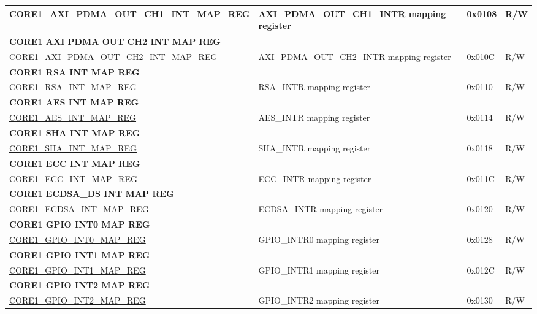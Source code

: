 \begin{longtable}{ | p{7.5cm} | p{7.2cm} | p{1.3cm} | p{1cm} | }
\hyperref[regdesc:CORE1AXIPDMAOUTCH1INTMAPREG]{CORE1\_AXI\_PDMA\_OUT\_CH1\_INT\_MAP\_REG} & AXI\_PDMA\_OUT\_CH1\_INTR mapping register & 0x0108 & R/W \\ \hline
\multicolumn{4}{|l|}{\textbf{CORE1 AXI PDMA OUT CH2 INT MAP REG}} \\ \hline
\hyperref[regdesc:CORE1AXIPDMAOUTCH2INTMAPREG]{CORE1\_AXI\_PDMA\_OUT\_CH2\_INT\_MAP\_REG} & AXI\_PDMA\_OUT\_CH2\_INTR mapping register & 0x010C & R/W \\ \hline
\multicolumn{4}{|l|}{\textbf{CORE1 RSA INT MAP REG}} \\ \hline
\hyperref[regdesc:CORE1RSAINTMAPREG]{CORE1\_RSA\_INT\_MAP\_REG} & RSA\_INTR mapping register & 0x0110 & R/W \\ \hline
\multicolumn{4}{|l|}{\textbf{CORE1 AES INT MAP REG}} \\ \hline
\hyperref[regdesc:CORE1AESINTMAPREG]{CORE1\_AES\_INT\_MAP\_REG} & AES\_INTR mapping register & 0x0114 & R/W \\ \hline
\multicolumn{4}{|l|}{\textbf{CORE1 SHA INT MAP REG}} \\ \hline
\hyperref[regdesc:CORE1SHAINTMAPREG]{CORE1\_SHA\_INT\_MAP\_REG} & SHA\_INTR mapping register & 0x0118 & R/W \\ \hline
\multicolumn{4}{|l|}{\textbf{CORE1 ECC INT MAP REG}} \\ \hline
\hyperref[regdesc:CORE1ECCINTMAPREG]{CORE1\_ECC\_INT\_MAP\_REG} & ECC\_INTR mapping register & 0x011C & R/W \\ \hline
\multicolumn{4}{|l|}{\textbf{CORE1 ECDSA\_DS INT MAP REG}} \\ \hline
\hyperref[regdesc:CORE1ECDSAINTMAPREG]{CORE1\_ECDSA\_INT\_MAP\_REG} & ECDSA\_INTR mapping register & 0x0120 & R/W \\ \hline
\multicolumn{4}{|l|}{\textbf{CORE1 GPIO INT0 MAP REG}} \\ \hline
\hyperref[regdesc:CORE1GPIOINT0MAPREG]{CORE1\_GPIO\_INT0\_MAP\_REG} & GPIO\_INTR0 mapping register & 0x0128 & R/W \\ \hline
\multicolumn{4}{|l|}{\textbf{CORE1 GPIO INT1 MAP REG}} \\ \hline
\hyperref[regdesc:CORE1GPIOINT1MAPREG]{CORE1\_GPIO\_INT1\_MAP\_REG} & GPIO\_INTR1 mapping register & 0x012C & R/W \\ \hline
\multicolumn{4}{|l|}{\textbf{CORE1 GPIO INT2 MAP REG}} \\ \hline
\hyperref[regdesc:CORE1GPIOINT2MAPREG]{CORE1\_GPIO\_INT2\_MAP\_REG} & GPIO\_INTR2 mapping register & 0x0130 & R/W \\ \hline

\end{longtable}
